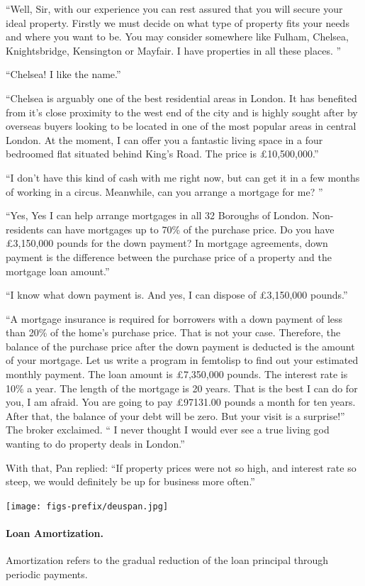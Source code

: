 \documentclass[a4paper,12pt]{book}
\begin{document}
“Well, Sir, with our experience you can rest
assured that you will secure your ideal property.
Firstly we must decide on what type of property
fits your needs and where you want to be. You
may consider somewhere like Fulham, Chelsea,
Knightsbridge, Kensington or Mayfair.
I have properties in all these places. ”

“Chelsea! I like the name.”

“Chelsea is arguably one of the best residential
areas in London. It has benefited from it’s close
proximity to the west end of the city and is highly
sought after by overseas buyers looking to be located
in one of the most popular areas in central London.
At the moment, I can offer you a fantastic living
space in a four bedroomed flat situated behind
King's Road. The price is £10,500,000.”

“I don't have this kind of cash with me right now,
but can get it in a few months of working in a
circus. Meanwhile, can you arrange a mortgage for me? ”

“Yes, Yes I can help arrange mortgages in all 32 Boroughs
of London. Non-residents can have mortgages up to 70\% of
the purchase price. Do you have £3,150,000 pounds for the
down payment? In mortgage agreements, down payment is
the difference between the purchase price of a property
and the mortgage loan amount.”

“I know what down payment is. And yes, I can dispose
of £3,150,000 pounds.”

“A mortgage insurance is required for borrowers with
a down payment of less than 20\% of the home's purchase
price. That is not your case. Therefore, the balance of
the purchase price after the down payment is deducted
is the amount of your mortgage. Let us write a program
in femtolisp to find out your estimated monthly payment.
The loan amount is £7,350,000 pounds. The interest rate
is 10\% a year. The length of the mortgage is 20 years.
That is the best I can do for you, I am afraid.
You are going to pay £97131.00 pounds a month for
ten years. After that, the balance of your debt
will be zero. But your visit is a surprise!”
The broker exclaimed. “ I never thought I would
ever see a true living god wanting to do property
deals in London.”

With that, Pan replied: “If property prices
were not so high, and interest rate so steep,
we would definitely be up for business more often.”

\texttt{[image: figs-prefix/deuspan.jpg]}

\paragraph{Loan Amortization.}
Amortization refers to the gradual reduction
of the loan principal through periodic payments.
\end{document}
